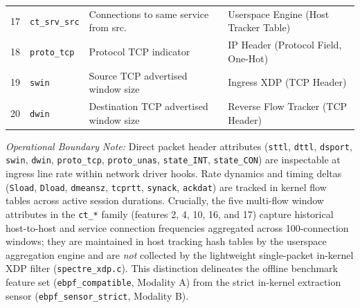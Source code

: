 \documentclass[conference]{IEEEtran}
\begin{document}
\begin{table}[t]
{\begin{tabular}{rlll}
17 & \texttt{ct\_srv\_src} & Connections to same service from src. & Userspace Engine (Host Tracker Table) \\
18 & \texttt{proto\_tcp} & Protocol TCP indicator & IP Header (Protocol Field, One-Hot) \\
19 & \texttt{swin} & Source TCP advertised window size & Ingress XDP (TCP Header) \\
20 & \texttt{dwin} & Destination TCP advertised window size & Reverse Flow Tracker (TCP Header) \\
\bottomrule
\end{tabular}%
}
\end{table}

\textit{Operational Boundary Note:} Direct packet header attributes (\texttt{sttl}, \texttt{dttl}, \texttt{dsport}, \texttt{swin}, \texttt{dwin}, \texttt{proto\_tcp}, \texttt{proto\_unas}, \texttt{state\_INT}, \texttt{state\_CON}) are inspectable at ingress line rate within network driver hooks. Rate dynamics and timing deltas (\texttt{Sload}, \texttt{Dload}, \texttt{dmeansz}, \texttt{tcprtt}, \texttt{synack}, \texttt{ackdat}) are tracked in kernel flow tables across active session durations. Crucially, the five multi-flow window attributes in the \texttt{ct\_*} family (features 2, 4, 10, 16, and 17) capture historical host-to-host and service connection frequencies aggregated across 100-connection windows; they are maintained in host tracking hash tables by the userspace aggregation engine and are \textit{not} collected by the lightweight single-packet in-kernel XDP filter (\texttt{spectre\_xdp.c}). This distinction delineates the offline benchmark feature set (\texttt{ebpf\_compatible}, Modality A) from the strict in-kernel extraction sensor (\texttt{ebpf\_sensor\_strict}, Modality B).
\end{document}
